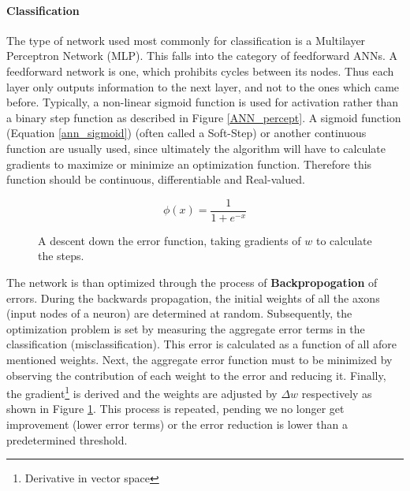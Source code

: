 	
	\paragraph{Classification}
		The type of network used most commonly for classification is a Multilayer Perceptron Network (MLP). This falls into the category of feedforward ANNs. A feedforward network is one, which prohibits cycles between its nodes. Thus each layer only outputs information to the next layer, and not to the ones which came before. Typically, a non-linear sigmoid function is used for activation rather than a binary step function as described in Figure \ref{ANN_percept}. A sigmoid function (Equation \ref{ann_sigmoid}) (often called a Soft-Step) or another continuous function are usually used, since ultimately the algorithm will have to calculate gradients to maximize or minimize an optimization function. Therefore this function should be continuous, differentiable and Real-valued.
		
		\begin{equation}
			\phi(x) = \frac{1}{1+ e^{-x}}
			\label{ann_sigmoid}
		\end{equation}
		
		\vspace{1cm}
		
		\begin{figure}[h]
			\centering
			\scalebox{0.5}{
				
			}
			\captionsetup{width=0.8\textwidth}
			\caption[ANN Gradient Descent]{
				\footnotesize{
					A descent down the error function, taking gradients of $ w $ to calculate the steps.
				}
			} 
			\label{ANN_backprop}
		\end{figure}
	
		\par
		
		The network is than optimized through the process of \textbf{Backpropogation} of errors. During the backwards propagation, the initial weights of all the axons (input nodes of a neuron) are determined at random. Subsequently, the optimization problem is set by measuring the aggregate error terms in the classification (misclassification). This error is calculated as a function of all afore mentioned weights. Next, the aggregate error function must to be minimized by observing the contribution of each weight to the error and reducing it. Finally, the gradient\footnote{Derivative in vector space} is derived and the weights are adjusted by $ \Delta w $ respectively as shown in Figure \ref{ANN_backprop}. This process is repeated, pending we no longer get improvement (lower error terms) or the error reduction is lower than a predetermined threshold.
	
